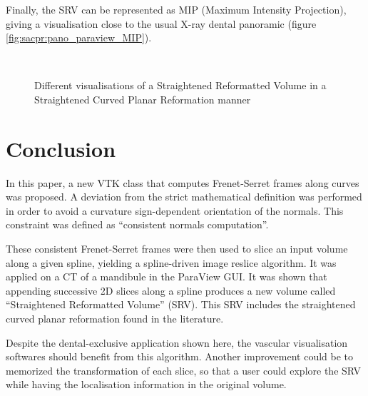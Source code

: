 \documentclass{InsightArticle}
\begin{document}
Finally, the SRV can be represented as MIP (Maximum Intensity Projection), 
giving a visualisation close to the usual X-ray dental panoramic
(figure \ref{fig:sacpr:pano_paraview_MIP}).
%
\begin{figure}
\centering
{}\\
\caption{Different visualisations of a Straightened Reformatted Volume in a
Straightened Curved Planar Reformation manner}
\label{fig:sacpr}
\end{figure}
%
%
\section{Conclusion}
%
In this paper, a new VTK class that computes Frenet-Serret frames along curves
was proposed. A deviation from the strict mathematical definition was performed
in order to avoid a curvature sign-dependent orientation of the normals. This
constraint was defined as ``consistent normals computation''.

These consistent Frenet-Serret frames were then used to slice an input volume
along a given spline, yielding a spline-driven image reslice algorithm. It was
applied on a CT of a mandibule in the ParaView GUI. It was shown that appending
successive 2D slices along a spline produces a new volume called ``Straightened
Reformatted Volume'' (SRV). This SRV includes the straightened curved planar
reformation found in the literature.

Despite the dental-exclusive application shown here, the vascular visualisation
softwares should benefit from this algorithm. Another improvement could be to 
memorized the transformation of each slice, so that a user could explore the SRV
while having the localisation information in the original volume.
%
\appendix
%
\end{document}
